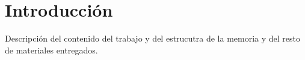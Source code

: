 \chapter{Introducción}
\label{cha:Introducción}

Descripción del contenido del trabajo y del estrucutra de la memoria y del
resto de materiales entregados.

